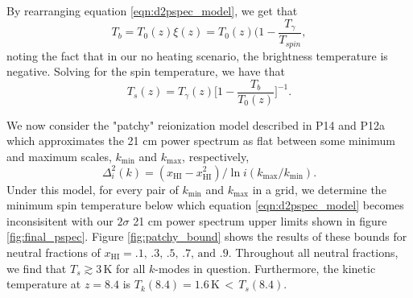 \documentclass[twocolumn,numberedappendix]{emulateapj} \shorttitle{PSA64}
\begin{document}
By rearranging equation \ref{eqn:d2pspec_model}, we get that 
\begin{equation}
    T_{b} = T_{0}(z)\xi(z) = T_{0}(z)(1 - \frac{T_{\gamma}}{T_{spin}},
\end{equation}
noting the fact that in our no heating scenario, the brightness temperature is
negative. Solving for the spin temperature, we have that 
\begin{equation}
    T_{s}(z) = T_{\gamma}(z)\Big[1 - \frac{T_{b}}{T_{0}(z)}\Big]^{-1}.
\end{equation}

We now consider the "patchy" reionization model described in P14 and P12a which
approximates the 21 cm power spectrum as flat between some minimum and maximum
scales, $k_{\text{min}}$ and $k_{\text{max}}$, respectively,
\begin{equation}\label{eqn:patchy_bound}
    \Delta^{2}_{i}(k) = (x_{\text{HI}} -
x_{\text{HI}}^{2})/\ln{i(k_{\text{max}}/k_{\text{min}})}.
\end{equation}
Under this model, for every pair of $k_{\text{min}}$ and $k_{\text{max}}$ in a
grid, we 
determine the minimum  spin temperature below which equation
\ref{eqn:d2pspec_model} becomes inconsisitent with our $2\sigma$ 21 cm power
spectrum upper limits shown in figure \ref{fig:final_pspec}.
Figure \ref{fig:patchy_bound} shows the results of these bounds
for neutral fractions of $x_{\text{HI}}=\text{.1, .3, .5, .7, and .9}$.
Throughout all neutral fractions, we find that $T_{s} \gtrsim 3\,\text{K}$ for all
$k$-modes in question. Furthermore, the kinetic temperature at $z=8.4$ is
$T_{k}(8.4) = 1.6\, \text{K} \, < \,T_{s}(8.4)$. 



%
\end{document}
